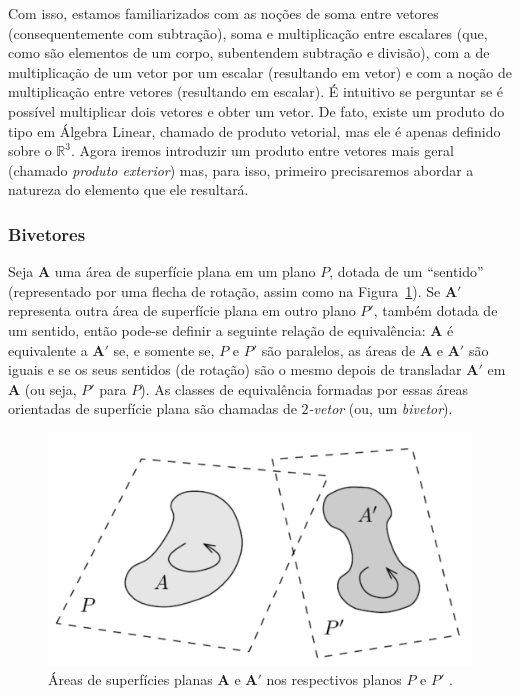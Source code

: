 \documentclass[a4paper,12pt]{report}
\theoremstyle{plain}
\theoremstyle{definition}
\begin{document}
	Com isso, estamos familiarizados com as noções de soma entre vetores (consequentemente com subtração), soma e multiplicação entre escalares (que, como são elementos de um corpo, subentendem subtração e divisão), com a de multiplicação de um vetor por um escalar (resultando em vetor) e com a noção de multiplicação entre vetores (resultando em escalar). É intuitivo se perguntar se é possível multiplicar dois vetores e obter um vetor. De fato, existe um produto do tipo em Álgebra Linear, chamado de produto vetorial, mas ele é apenas definido sobre o $\mathbb{R}^3$. Agora iremos introduzir um produto entre vetores mais geral (chamado \textit{produto exterior}) mas, para isso, primeiro precisaremos abordar a natureza do elemento que ele resultará.
	
	\subsubsection{Bivetores}
	
	Seja $\mathbf A$ uma área de superfície plana em um plano $P$, dotada de um ``sentido'' (representado por uma flecha de rotação, assim como na Figura~\ref{fig:2blade}). Se $\mathbf A'$ representa outra área de superfície plana em outro plano $P'$, também dotada de um sentido, então pode-se definir a seguinte relação de equivalência: $\mathbf A$ é equivalente a $\mathbf A'$ se, e somente se, $P$ e $P'$ são paralelos, as áreas de $\mathbf A$ e $\mathbf A'$ são iguais e se os seus sentidos (de rotação) são o mesmo depois de transladar $\mathbf A'$ em $\mathbf A$ (ou seja, $P'$ para $P$). As classes de equivalência formadas por essas áreas orientadas de superfície plana são chamadas de \textit{$2$-vetor} (ou, um \textit{bivetor}).

	\begin{figure}[H]
		\begin{center}
			\includegraphics[width=0.5\linewidth]{figures/2blade.pdf}
		\end{center}
		\caption{Áreas de superfícies planas $\mathbf A$ e $\mathbf A'$ nos respectivos planos $P$ e $P'$ \cite{lundholm2009clifford}.}
		\label{fig:2blade}
	\end{figure}
	
\end{document}
